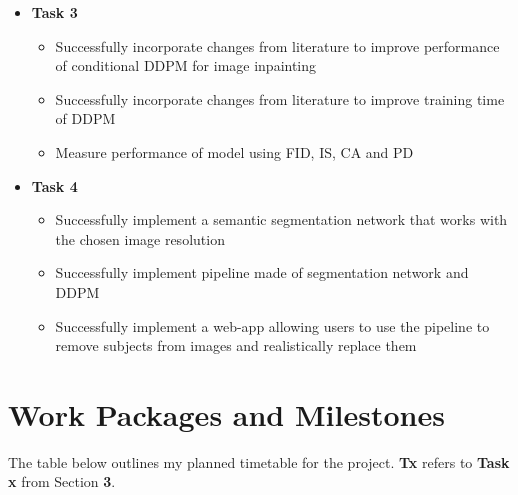 \documentclass{article}
\begin{document}
\begin{itemize}
    \item \textbf{Task 3}
    \begin{itemize}
        \item Successfully incorporate changes from literature to improve performance of conditional DDPM for image inpainting
        \item Successfully incorporate changes from literature to improve training time of DDPM
        \item Measure performance of model using FID, IS, CA and PD
    \end{itemize}
    \item \textbf{Task 4}
    \begin{itemize}
        \item Successfully implement a semantic segmentation network that works with the chosen image resolution
        \item Successfully implement pipeline made of segmentation network and DDPM
        \item Successfully implement a web-app allowing users to use the pipeline to remove subjects from images and realistically replace them
    \end{itemize}
\end{itemize}

\section{Work Packages and Milestones}

The table below outlines my planned timetable for the project. \textbf{Tx} refers to \textbf{Task x} from Section \textbf{3}.
\end{document}
